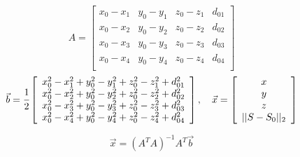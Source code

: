 \begin{equation}
	A=\left[
	\begin{array}{cccc}
		x_0-x_1 & y_0-y_1 & z_0-z_1 & d_{01}\\
		x_0-x_2 & y_0-y_2 & z_0-z_2 & d_{02}\\
		x_0-x_3 & y_0-y_3 & z_0-z_3 & d_{03}\\
		x_0-x_4 & y_0-y_4 & z_0-z_4 & d_{04}\\
	\end{array}
	\right]
\end{equation}
\begin{equation}
	\vec{b}=\cfrac{1}{2}\left[
	\begin{array}{c}
		x_0^2-x_1^2+y_0^2-y_1^2+z_0^2-z_1^2+d_{01}^2\\
		x_0^2-x_2^2+y_0^2-y_2^2+z_0^2-z_2^2+d_{02}^2\\
		x_0^2-x_3^2+y_0^2-y_3^2+z_0^2-z_3^2+d_{03}^2\\
		x_0^2-x_4^2+y_0^2-y_4^2+z_0^2-z_4^2+d_{04}^2\\
	\end{array}
	\right]
	,~~~
	\vec{x}=\left[
	\begin{array}{c}
		x\\
		y\\
		z\\
		||S-S_0||_2\\
	\end{array}
	\right]
\end{equation}

\begin{equation}
	\vec{x}=(A^T A)^{-1} A^T\vec{b}
\end{equation}
